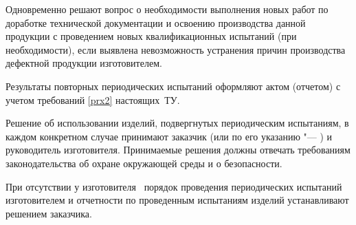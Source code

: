 Одновременно решают вопрос о необходимости выполнения новых работ по доработке технической документации и освоению производства данной продукции с проведением новых квалификационных испытаний (при необходимости), если выявлена невозможность устранения причин производства дефектной продукции изготовителем.

\point  
Результаты повторных периодических испытаний оформляют актом (отчетом) с учетом требований  \ref{prx2} настоящих~ТУ.

\point  
Решение об использовании изделий, подвергнутых периодическим испытаниям, в каждом конкретном случае принимают заказчик (или по его указанию "--- \client) и руководитель изготовителя. Принимаемые решения должны отвечать требованиям законодательства об охране окружающей среды и о безопасности.

\point 
При отсутствии у изготовителя \client \ порядок проведения периодических испытаний изготовителем и отчетности по проведенным испытаниям изделий устанавливают решением заказчика.